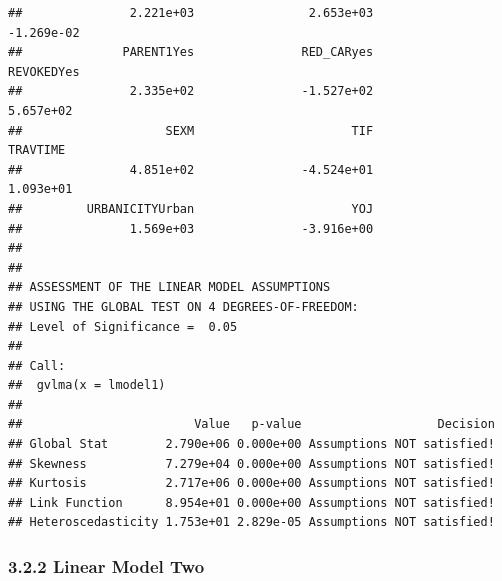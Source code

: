 \documentclass[]{article}
\begin{document}
\begin{verbatim}
##               2.221e+03                2.653e+03               -1.269e-02  
##              PARENT1Yes               RED_CARyes               REVOKEDYes  
##               2.335e+02               -1.527e+02                5.657e+02  
##                    SEXM                      TIF                 TRAVTIME  
##               4.851e+02               -4.524e+01                1.093e+01  
##         URBANICITYUrban                      YOJ  
##               1.569e+03               -3.916e+00  
## 
## 
## ASSESSMENT OF THE LINEAR MODEL ASSUMPTIONS
## USING THE GLOBAL TEST ON 4 DEGREES-OF-FREEDOM:
## Level of Significance =  0.05 
## 
## Call:
##  gvlma(x = lmodel1) 
## 
##                        Value   p-value                   Decision
## Global Stat        2.790e+06 0.000e+00 Assumptions NOT satisfied!
## Skewness           7.279e+04 0.000e+00 Assumptions NOT satisfied!
## Kurtosis           2.717e+06 0.000e+00 Assumptions NOT satisfied!
## Link Function      8.954e+01 0.000e+00 Assumptions NOT satisfied!
## Heteroscedasticity 1.753e+01 2.829e-05 Assumptions NOT satisfied!
\end{verbatim}

\subsubsection{3.2.2 Linear Model Two}\label{linear-model-two}
\end{document}
